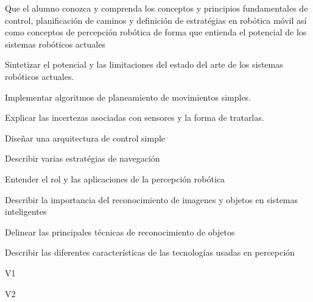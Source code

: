 \begin{syllabus}


\begin{justification}
Que el alumno conozca y comprenda los conceptos y principios fundamentales de control, planificación de caminos y
definición de estratégias en robótica móvil así como conceptos de percepción robótica de forma que entienda el potencial
de los sistemas robóticos actuales
\end{justification}

\begin{goals}
\item Sintetizar el potencial y las limitaciones del estado del arte de los sistemas robóticos actuales.
\item Implementar algoritmos de planeamiento de movimientos simples.
\item Explicar las incertezas asociadas con sensores y la forma de tratarlas.
\item Diseñar una arquitectura de control simple
\item Describir varias estratégias de navegación
\item Entender el rol y las aplicaciones de la percepción robótica
\item Describir la importancia del reconocimiento de imagenes y objetos en sistemas inteligentes
\item Delinear las principales técnicas de reconocimiento de objetos
\item Describir las diferentes características de las tecnologías usadas en percepción
\end{goals}

\begin{outcomes}{V1}
    \item {}
    \item {}
    \item {}
    \item {}
    \item {}
\end{outcomes}

\begin{outcomes}{V2}
    \item {}
    \item {}
    \item {}
    \item {}
\end{outcomes}


\end{syllabus}
